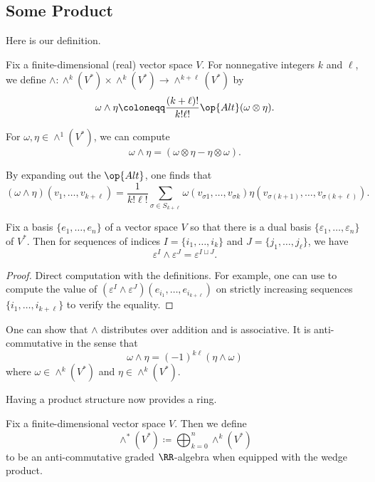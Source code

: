 \documentclass[../notes.tex]{subfiles}
\begin{document}
\subsection{Some Product}
Here is our definition.
\begin{definition}
	Fix a finite-dimensional (real) vector space $V$. For nonnegative integers $k$ and $\ell$, we define $\land\colon\land^k(V^*)\times\land^k(V^*)\to\land^{k+\ell}(V^*)$ by
	\[\omega\land\eta\coloneqq\frac{(k+\ell)!}{k!\ell!}\op{Alt}(\omega\otimes\eta).\]
\end{definition}
\begin{example}
	For $\omega,\eta\in\land^1(V^*)$, we can compute
	\[\omega\land\eta=(\omega\otimes\eta-\eta\otimes\omega).\]
\end{example}
\begin{remark} \label{rem:explicit-wedge}
	By expanding out the $\op{Alt}$, one finds that
	\[(\omega\land\eta)(v_1,\ldots,v_{k+\ell})=\frac1{k!\ell!}\sum_{\sigma\in S_{k+\ell}}\omega(v_{\sigma1},\ldots,v_{\sigma k})\eta(v_{\sigma(k+1)},\ldots,v_{\sigma(k+\ell)}).\]
\end{remark}
\begin{lemma}
	Fix a basis $\{e_1,\ldots,e_n\}$ of a vector space $V$ so that there is a dual basis $\{\varepsilon_1,\ldots,\varepsilon_n\}$ of $V^*$. Then for sequences of indices $I=\{i_1,\ldots,i_k\}$ and $J=\{j_1,\ldots,j_\ell\}$, we have
	\[\varepsilon^I\land\varepsilon^J=\varepsilon^{I\sqcup J}.\]
\end{lemma}
\begin{proof}
	Direct computation with the definitions. For example, one can use  to compute the value of $\left(\varepsilon^I\land\varepsilon^J\right)(e_{i_1},\ldots,e_{i_{k+\ell}})$ on strictly increasing sequences $\{i_1,\ldots,i_{k+\ell}\}$ to verify the equality.
\end{proof}
\begin{remark}
	One can show that $\land$ distributes over addition and is associative. It is anti-commutative in the sense that
	\[\omega\land\eta=(-1)^{k\ell}(\eta\land\omega)\]
	where $\omega\in\land^k(V^*)$ and $\eta\in\land^k(V^*)$.
\end{remark}
Having a product structure now provides a ring.
\begin{definition}
	Fix a finite-dimensional vector space $V$. Then we define
	\[\land^*(V^*)\coloneqq\bigoplus_{k=0}^n\land^k(V^*)\]
	to be an anti-commutative graded $\RR$-algebra when equipped with the wedge product.
\end{definition}
\end{document}
